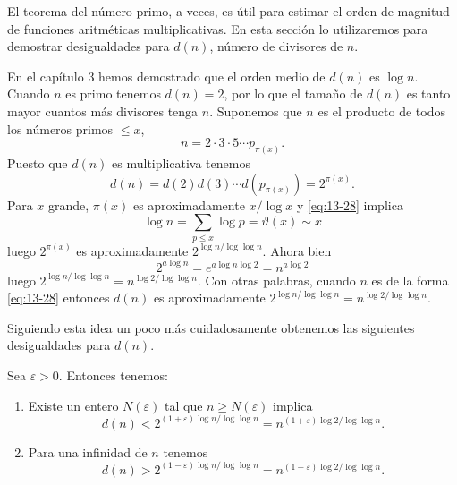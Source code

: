 \documentclass[12pt,a4paper]{book}
\begin{document}
    El teorema del número primo, a veces, es útil para estimar el orden de magnitud de
    funciones aritméticas multiplicativas. En esta sección lo utilizaremos para demostrar
    desigualdades para $d(n)$, número de divisores de $n$.

    En el capítulo 3 hemos demostrado que el orden medio de $d(n)$ es $\log n$. Cuando $n$ es
    primo tenemos $d(n)=2$, por lo que el tamaño de $d(n)$ es tanto mayor cuantos más divisores
    tenga $n$. Suponemos que $n$ es el producto de todos los números primos $\leq x$,
    \begin{equation}\label{eq:13-28}
        n=2\cdot3\cdot5\cdots p_{\pi(x)}.
    \end{equation}
    Puesto que $d(n)$ es multiplicativa tenemos
    \begin{equation*}
        d(n)=d(2)d(3)\cdots d(p_{\pi(x)})=2^{\pi(x)}.
    \end{equation*}
    Para $x$ grande, $\pi(x)$ es aproximadamente $x/\log x$ y \eqref{eq:13-28} implica
    \begin{equation*}
        \log n=\sum_{p\leq x}\log p=\vartheta(x)\sim x
    \end{equation*}
    luego $2^{\pi(x)}$ es aproximadamente $2^{\log n/\log\log n}$. Ahora bien
    \begin{equation*}
        2^{a\log n}=e^{a\log n\log2}=n^{a\log2}
    \end{equation*}
    luego $2^{\log n/\log\log n}=n^{\log2/\log\log n}$. Con otras palabras, cuando $n$ es de la
    forma \eqref{eq:13-28} entonces $d(n)$ es aproximadamente
    $2^{\log n/\log\log n}=n^{\log2/\log\log n}$.

    Siguiendo esta idea un poco más cuidadosamente obtenemos las siguientes desigualdades para
    $d(n)$.

    \begin{teorema}\label{teo:13-12}
        Sea $\varepsilon>0$. Entonces tenemos:
        \begin{enumerate}
            \item[(a)] Existe un entero $N(\varepsilon)$ tal que $n\geq N(\varepsilon)$
            implica
            \begin{equation*}
                d(n)<2^{(1+\varepsilon)\log n/\log\log n}=n^{(1+\varepsilon)\log2/\log\log n}.
            \end{equation*}
            \item[(b)] Para una infinidad de $n$ tenemos
            \begin{equation*}
                d(n)>2^{(1-\varepsilon)\log n/\log\log n}=n^{(1-\varepsilon)\log2/\log\log n}.
            \end{equation*}
        \end{enumerate}
    \end{teorema}
\end{document}
